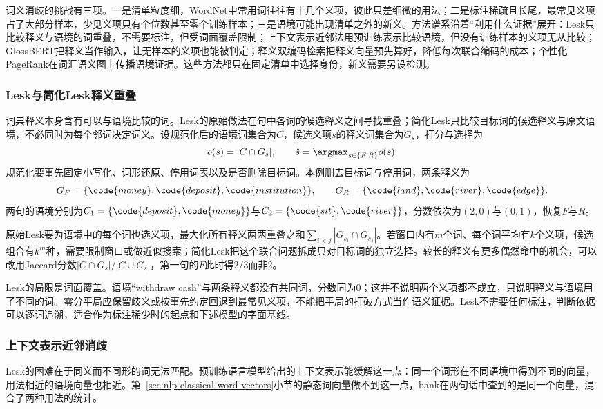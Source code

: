 词义消歧的挑战有三项。一是清单粒度细，WordNet中常用词往往有十几个义项，彼此只差细微的用法；二是标注稀疏且长尾，最常见义项占了大部分样本，少见义项只有个位数甚至零个训练样本；三是语境可能出现清单之外的新义。方法谱系沿着“利用什么证据”展开：Lesk只比较释义与语境的词重叠，不需要标注，但受词面覆盖限制；上下文表示近邻法用预训练表示比较语境，但没有训练样本的义项无从比较；GlossBERT把释义当作输入，让无样本的义项也能被判定；释义双编码检索把释义向量预先算好，降低每次联合编码的成本；个性化PageRank在词汇语义图上传播语境证据。这些方法都只在固定清单中选择身份，新义需要另设检测。

\subsubsection{Lesk与简化Lesk释义重叠}
\label{sec:nlp-analysis-lesk}

词典释义本身含有可以与语境比较的词。Lesk的原始做法在句中各词的候选释义之间寻找重叠\cite{v9a-lesk1986}；简化Lesk只比较目标词的候选释义与原文语境，不必同时为每个邻词决定词义。设规范化后的语境词集合为$C$，候选义项$s$的释义词集合为$G_s$，打分与选择为
\[
  o(s)=|C\cap G_s|,\qquad \hat s=\argmax_{s\in\{F,R\}}o(s).
\]
规范化要事先固定小写化、词形还原、停用词表以及是否删除目标词。本例删去目标词与停用词，两条释义为
\[
 G_F=\{\code{money},\code{deposit},\code{institution}\},\qquad
 G_R=\{\code{land},\code{river},\code{edge}\}.
\]
两句的语境分别为$C_1=\{\code{deposit},\code{money}\}$与$C_2=\{\code{sit},\code{river}\}$，分数依次为$(2,0)$与$(0,1)$，恢复$F$与$R$。

原始Lesk要为语境中的每个词也选义项，最大化所有释义两两重叠之和$\sum_{i<j}|G_{s_i}\cap G_{s_j}|$。若窗口内有$m$个词、每个词平均有$k$个义项，候选组合有$k^m$种，需要限制窗口或做近似搜索；简化Lesk把这个联合问题拆成只对目标词的独立选择。较长的释义有更多偶然命中的机会，可以改用Jaccard分数$|C\cap G_s|/|C\cup G_s|$，第一句的$F$此时得$2/3$而非2。

Lesk的局限是词面覆盖。语境“withdraw cash”与两条释义都没有共同词，分数同为0；这并不说明两个义项都不成立，只说明释义与语境用了不同的词。零分平局应保留歧义或按事先约定回退到最常见义项，不能把平局的打破方式当作语义证据。Lesk不需要任何标注，判断依据可以逐词追溯，适合作为标注稀少时的起点和下述模型的字面基线。

\subsubsection{上下文表示近邻消歧}
\label{sec:nlp-analysis-wsd-knn}

Lesk的困难在于同义而不同形的词无法匹配。预训练语言模型给出的上下文表示能缓解这一点：同一个词形在不同语境中得到不同的向量，用法相近的语境向量也相近。第~\ref{sec:nlp-classical-word-vectors}小节的静态词向量做不到这一点，bank在两句话中查到的是同一个向量，混合了两种用法的统计。

